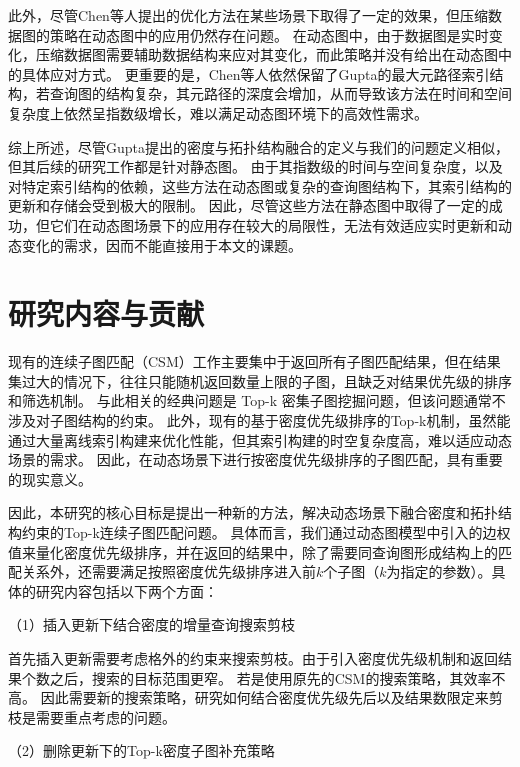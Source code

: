 此外，尽管Chen等人提出的优化方法在某些场景下取得了一定的效果，但压缩数据图的策略在动态图中的应用仍然存在问题。
在动态图中，由于数据图是实时变化，压缩数据图需要辅助数据结构来应对其变化，而此策略并没有给出在动态图中的具体应对方式。
更重要的是，Chen等人依然保留了Gupta的最大元路径索引结构，若查询图的结构复杂，其元路径的深度会增加，从而导致该方法在时间和空间复杂度上依然呈指数级增长，难以满足动态图环境下的高效性需求。


综上所述，尽管Gupta提出的密度与拓扑结构融合的定义与我们的问题定义相似，但其后续的研究工作都是针对静态图。
由于其指数级的时间与空间复杂度，以及对特定索引结构的依赖，这些方法在动态图或复杂的查询图结构下，其索引结构的更新和存储会受到极大的限制。
因此，尽管这些方法在静态图中取得了一定的成功，但它们在动态图场景下的应用存在较大的局限性，无法有效适应实时更新和动态变化的需求，因而不能直接用于本文的课题。
\section{研究内容与贡献}
现有的连续子图匹配（CSM）工作主要集中于返回所有子图匹配结果，但在结果集过大的情况下，往往只能随机返回数量上限的子图，且缺乏对结果优先级的排序和筛选机制。
与此相关的经典问题是 Top-k 密集子图挖掘问题，但该问题通常不涉及对子图结构的约束。
此外，现有的基于密度优先级排序的Top-k机制，虽然能通过大量离线索引构建来优化性能，但其索引构建的时空复杂度高，难以适应动态场景的需求。
因此，在动态场景下进行按密度优先级排序的子图匹配，具有重要的现实意义。

因此，本研究的核心目标是提出一种新的方法，解决动态场景下融合密度和拓扑结构约束的Top-k连续子图匹配问题。
具体而言，我们通过动态图模型中引入的边权值来量化密度优先级排序，并在返回的结果中，除了需要同查询图形成结构上的匹配关系外，还需要满足按照密度优先级排序进入前$k$个子图（$k$为指定的参数）。具体的研究内容包括以下两个方面：

（1）插入更新下结合密度的增量查询搜索剪枝

      首先插入更新需要考虑格外的约束来搜索剪枝。由于引入密度优先级机制和返回结果个数之后，搜索的目标范围更窄。
      若是使用原先的CSM的搜索策略，其效率不高。
      因此需要新的搜索策略，研究如何结合密度优先级先后以及结果数限定来剪枝是需要重点考虑的问题。

（2）删除更新下的Top-k密度子图补充策略


